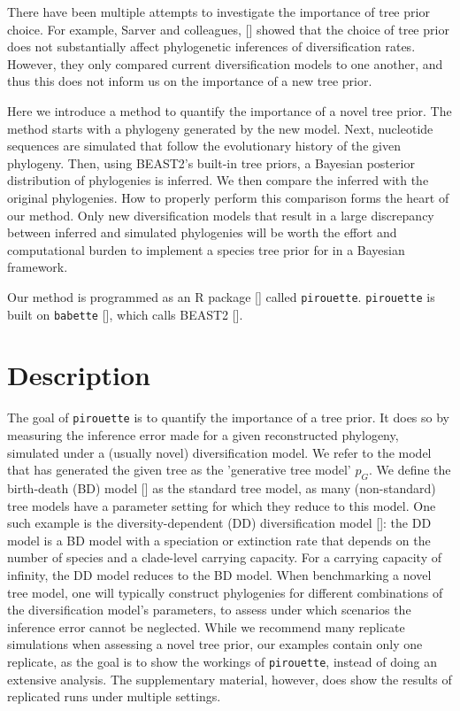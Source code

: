There have been multiple attempts to investigate the importance of tree
prior choice. For example, Sarver and colleagues, [\cite{sarver2019choice}] 
showed that the choice of tree prior does not 
substantially affect phylogenetic inferences of diversification rates.
However, they only compared current diversification models to one another, 
and thus this does not inform us on the importance of a new tree prior.

Here we introduce a method to quantify the importance of a novel tree prior.
The method starts with a phylogeny generated by the new model. 
Next, nucleotide sequences are simulated that follow the evolutionary 
history of the given phylogeny. 
Then, using BEAST2's built-in tree priors,
a Bayesian posterior distribution of phylogenies is inferred. 
We then compare the inferred with the original phylogenies. 
How to properly perform this comparison forms the heart of our method.
Only new diversification models that result 
in a large discrepancy between inferred and simulated phylogenies 
will be worth the effort and computational burden to implement 
a species tree prior for in a Bayesian framework.

Our method is programmed as an R package [\cite{R}] called \verb;pirouette;.
\verb;pirouette; is built on \verb;babette; [\cite{bilderbeek2018babette}], 
which calls BEAST2 [\cite{bouckaert2019beast}]. 

\section{Description}

The goal of \verb;pirouette; is to quantify the importance of a tree prior.
It does so by measuring the inference error made 
for a given reconstructed phylogeny, 
simulated under a (usually novel) diversification model.
We refer to the model that has generated the given tree
as the 'generative tree model' $\mathit{p_{G}}$.
We define the birth-death (BD) model [\cite{nee1994reconstructed}] as
the standard tree model, as many (non-standard) tree models 
have a parameter setting for which they reduce to this model. 
One such example is the diversity-dependent (DD) diversification 
model [\cite{DDD, etienne2012diversity}]:
the DD model is a BD model with a speciation or extinction rate that depends 
on the number of species and a clade-level carrying capacity. For a carrying capacity
of infinity, the DD model reduces to the BD model.
When benchmarking a novel tree model, 
one will typically construct phylogenies 
for different combinations of the diversification model's parameters, 
to assess under which scenarios the inference error cannot be neglected. 
While we recommend many replicate simulations 
when assessing a novel tree prior, 
our examples contain only one replicate,
as the goal is to show the workings of \verb;pirouette;,
instead of doing an extensive analysis.
The supplementary material, however, does show the results
of replicated runs under multiple settings.

